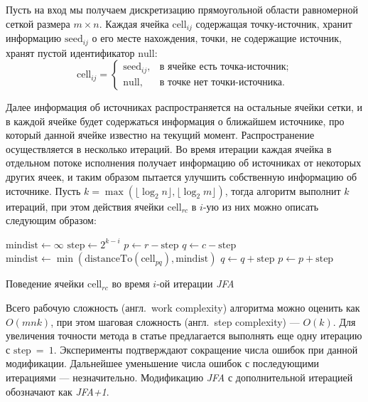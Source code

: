 \documentclass[12pt]{article}
\begin{document}
Пусть на вход мы получаем дискретизацию прямоугольной области 
равномерной сеткой размера $m \times n$. Каждая ячейка $\mathrm{cell}_{ij}$ 
содержащая точку-источник, хранит информацию $\mathrm{seed}_{ij}$ о его месте нахождения,
точки, не содержащие источник, хранят пустой идентификатор ${\mathrm{null}}$:
$$
	\mathrm{cell}_{ij} = \left\lbrace
	\begin{array}{ll}
	\mathrm{seed}_{ij}, & \mbox{в ячейке есть точка-источник;} \\
	\mathrm{null}, & \mbox{в точке нет точки-источника.}
	\end{array}
	\right.
$$

Далее информация об источниках распространяется на остальные ячейки
сетки, и в каждой ячейке будет содержаться информация 
о ближайшем источнике, про который данной ячейке известно на текущий момент. 
Распространение осуществляется в несколько итераций. Во время итерации 
каждая ячейка в отдельном потоке исполнения получает информацию об 
источниках от некоторых других ячеек, и таким образом пытается улучшить
собственную информацию об источнике. Пусть  $k = \max(\lfloor\log_2n\rfloor, \lfloor\log_2m\rfloor)$, 
тогда алгоритм выполнит $k$ итераций, при этом действия ячейки $\mathrm{cell}_{rc}$ 
в $i$-ую из них можно описать следующим образом:

\begin{algorithm}
\begin{algorithmic}
\State $\mathrm{mindist} \leftarrow \infty$
\State $\mathrm{step} \gets 2^{k - i}$
\State $p \gets r - \mathrm{step}$
	\State $q \gets c - \mathrm{step}$
			\State $\mathrm{mindist} \gets 
 					\min(\mathrm{distanceTo}(\mathrm{cell}_{pq}), \mathrm{mindist})$
		\EndIf
		\State $q \gets q + \mathrm{step}$
 	\EndWhile
\State $p \gets p + \mathrm{step}$
\EndWhile
\end{algorithmic}
\caption{Поведение ячейки $\mathrm{cell}_{rc}$ во время $i$-ой итерации
\emph{JFA}}
\label{jfa_algo}
\end{algorithm}

Всего рабочую сложность (англ.~work complexity) алгоритма можно оценить 
как $O(m n k)$, при этом шаговая сложность (англ.~step complexity) --- $O(k)$. 
Для увеличения точности метода в статье предлагается выполнять 
еще одну итерацию с $\mathrm{step}~=~1$. Эксперименты подтверждают 
сокращение числа ошибок при данной модификации. Дальнейшее уменьшение числа 
ошибок с последующими итерациями --- незначительно. 
Модификацию \emph{JFA} с дополнительной итерацией обозначают как \emph{JFA+1}.
\end{document}
